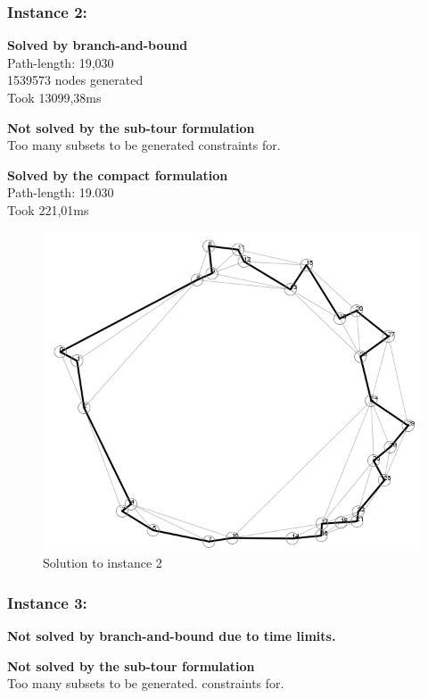 \subsubsection*{Instance 2:}

\newpar \textbf{Solved by branch-and-bound}\\
Path-length: 19,030\\
1539573 nodes generated\\
Took 13099,38ms

\newpar \textbf{Not solved by the sub-tour formulation}\\
Too many subsets to be generated constraints for.

\newpar \textbf{Solved by the compact formulation}\\
Path-length: 19.030\\
Took 221,01ms

\begin{figure}[H]
	\includegraphics[width=.9\textwidth]{figures/Instance2Solution.png}
	\caption{Solution to instance 2}
	\label{solution:2}
\end{figure}

\subsubsection*{Instance 3:}

\newpar \textbf{Not solved by branch-and-bound due to time limits.}

\newpar \textbf{Not solved by the sub-tour formulation}\\
Too many subsets to be generated. constraints for.

